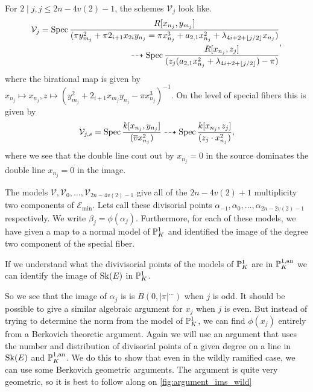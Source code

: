 For $2 \mid j, j \le 2n - 4v(2) - 1$, the schemes $\mathcal{V} _j$ look like. 
\[
	\begin{aligned}
		\mathcal{V}_j = \operatorname{Spec} \frac{R[x_{n_j},y_{m_j}]}{(\pi y^2_{m_j} + \pi 2_{{i + 1}}x_{2i}y_{n_j} = \pi x_{n_j}^3 + a_{2,1}x_{n_j}^2 + \lambda_{4i + 2 + \left\lfloor j / 2 \right\rfloor} x_{n_j})} \\ \dashrightarrow \operatorname{Spec} \frac{R[ x_{n_j}, z_j]}{(z_j(a_{2,1} x_{n_j}^2 + \lambda_{4i + 2 + \left\lfloor j / 2 \right\rfloor})- \pi)} 
	\end{aligned}
,\]
where the birational map is given by $x_{n_j} \mapsto  x_{n_j}, z \mapsto (y^2_{m_j} + 2_{i + 1 }x_{m_j}y_{n_j} - \pi x_{n_j}^3)^{-1}$. 
On the level of special fibers this is given by \[
	\mathcal{V} _{j, s} = \operatorname{Spec} \frac{k[x_{n_j}, y_{n_j}]}{(\overline{v}x^2_{n_j})} \dashrightarrow \operatorname{Spec} \frac{k[x_{n_j}, z_j]}{(z_j \cdot  x^2_{n_j})}
,\]
where we see that the double line cout out by  $x_{n_j} = 0$ in the source dominates the double line $x_{n_j} = 0$ in the image. 


\bigskip

The models $\mathcal{V} , \mathcal{V} _{0}, \ldots, \mathcal{V} _{2n - 4v(2) - 1}$ give all of the $2n - 4v(2) + 1$ multiplicity two components of  $\mathscr E_\text{min} $. 
Lets call these divisorial points $\alpha_{-1}, \alpha_0, \ldots, \alpha_{2n-2v(2) - 1}$ respectively. 
We write $\beta_j = \phi(\alpha_j)$. 
Furthermore, for each of these models, we have given a map to a normal model of $\mathbb{P}^{1}_{K}$  and identified the image of the degree two component of the special fiber. 

If we understand what the divivisorial points of the models of $\mathbb{P}^{1}_K$ are in $\mathbb{P}^{1, \text{an}}_K$ we can identify the image of  $\operatorname{Sk}(E)$ in $\mathbb{P}^{1}_K$. 


So we see that the image of $\alpha_{j}$ is is $B(0, |\pi|^{\ldots})$ when $j$ is odd. 
It should be possible to give a similar algebraic argument for $x_{j}$ when $j$ is even.
But instead of trying to determine the norm from the model of $\mathbb{P}^{1}_K$, we can find $\phi(x_j)$ entirely from a Berkovich theoretic argument. 
Again we will use an argument that uses the number and distribution of divisorial points of a given degree on a line in $\operatorname{Sk}(E)$ and $\mathbb{P}^{1, \text{an}}_K$.
We do this to show that even in the wildly ramified case, we can use some Berkovich geometric arguments. 
The argument is quite very geometric, so it is best to follow along on \cref{fig:argument_ims_wild}

